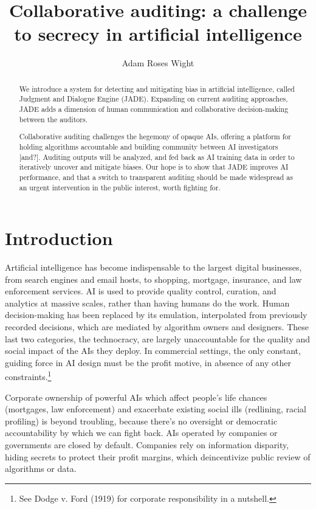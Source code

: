 \documentclass[format=sigconf, authorversion]{acmart}
\title{Collaborative auditing: a challenge to secrecy in artificial intelligence}
\author{Adam Roses Wight}
\affiliation{Wikimedia Foundation}
\begin{document}
\begin{abstract}
We introduce a system for detecting and mitigating bias in artificial intelligence, called Judgment and Dialogue Engine (JADE).  Expanding on current auditing approaches, JADE adds a dimension of human communication and collaborative decision-making between the auditors.

Collaborative auditing challenges the hegemony of opaque AIs, offering a platform for holding algorithms accountable and building community between AI investigators [and?].  Auditing outputs will be analyzed, and fed back as AI training data in order to iteratively uncover and mitigate biases.  Our hope is to show that JADE improves AI performance, and that a switch to transparent auditing should be made widespread as an urgent intervention in the public interest, worth fighting for.
\end{abstract}

\maketitle

\section{Introduction}

Artificial intelligence has become indispensable to the largest digital businesses, from search engines and email hosts, to shopping, mortgage, insurance, and law enforcement services.  AI is used to provide quality control, curation, and analytics at massive scales, rather than having humans do the work.  Human decision-making has been replaced by its emulation, interpolated from previously recorded decisions, which are mediated by algorithm owners and designers.  These last two categories, the technocracy, are largely unaccountable for the quality and social impact of the AIs they deploy.  In commercial settings, the only constant, guiding force in AI design must be the profit motive, in absence of any other constraints.\footnote{See Dodge v. Ford (1919) for corporate responsibility in a nutshell.}

Corporate ownership of powerful AIs which affect people's life chances (mortgages, law enforcement) and exacerbate existing social ills (redlining, racial profiling) is beyond troubling, because there's no oversight or democratic accountability by which we can fight back.  AIs operated by companies or governments are closed by default.  Companies rely on information disparity, hiding secrets to protect their profit margins, which deincentivize public review of algorithms or data.
\end{document}
